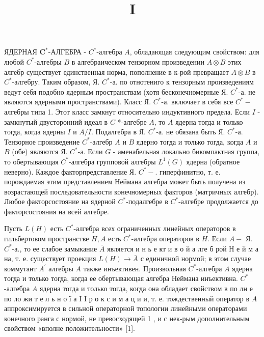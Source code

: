 \documentclass[10pt]{article}
\title{$\mathbf{I}$ }
\author{}
\date{}
\begin{document}
\maketitle

ЯДЕРНАЯ $\boldsymbol{C}^{*}$-АЛГЕБРА - $C^{*}$-алгебра $A$, обладающая следующим свойством: для любой $C^{*}$-алгебры $B$ в алгебраическом тензорном произведении $A \otimes B$ этих алгебр существует единственная норма, пополнение в к-рой превращает $A \otimes B$ в $C^{*}$-алгебру. Таким образом, Я. $C^{*}$-а. по отнотениго к тензорным произведениям ведут себя подобно ядерным пространствам (хотя бесконечномерные Я. $C^{*}$-а. не являются ядерными пространствами). Класс Я. $C^{*}$-а. включает в себя все $C^{*}-$ алгебры типа 1. Этот класс замкнут относительно индуктивного предела. Если $I$ - замкнутый двусторонний идеал в $C$ *-алгебре $A$, то $A$ ядерна тогда и только тогда, когда ядерны $I$ и $A / I$. Подалгебра в Я. $C^{*}$-а. не обязана быть Я. $C^{*}$-а. Тензорное произведение $C^{*}$-алгебр $A$ и $B$ ядерно тогда и только тогда, когда $A$ и $B$ (обе) являются Я. $C^{*}$-а. Если $G$ - аменабельная локально бикомпактная группа, то обертывающая $C^{*}$-алгебра групповой алгебры $L^{1}(G)$ ядерна (обратное неверно). Каждое факторпредставление Я. $C^{*}-$. гиперфинитно, т. е. порождаемая этим представлением Неймана алгебра может быть получена из возрастающей последовательности конечномерных факторов (матричных алгебр). Любое факторсостояние на ядерной $C^{*}$-подалгебре в $C^{*}$-алгебре продолжается до факторсостояния на всей алгебре.



Пусть $L(H)$ есть $C^{*}$-алгебра всех ограниченных линейных операторов в гильбертовом пространстве $H, A$ есть $C^{*}$-алгебра операторов в $H$. Если $A-$ Я. $C^{*}$-а., то ее слабое замыкание $\bar{A}$ является и н ь е кт и в о й а лге б рой Н е й м а на, т. е. существует проекция $L(H) \rightarrow \bar{A}$ с единичной нормой; в этом случае коммутант $A^{\prime}$ алгебры $A$ также инъективен. Произвольная $C^{*}$-алгебра $A$ ядерна тогда и только тогда, когда ее обертывающая алгебра Неймана инъективна. $C^{*}$-алгебра $A$ ядерна тогда и только тогда, когда она обладает свойством в по лн е по ло жи т е л ь н о ї а I I р о к с и м а ц и и, т. е. тождественный оператор в $A$ аппроксимируется в сильной операторной топологии линейными операторами конечного ранга с нормой, не превосходящей 1 , и с нек-рым дополнительным свойством «вполне положительности» [1].
\end{document}
